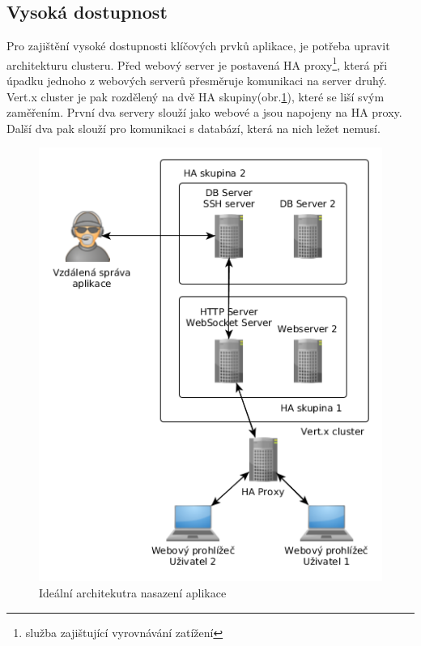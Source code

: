 \subsection{Vysoká dostupnost}

Pro zajištění vysoké dostupnosti klíčových prvků aplikace, je potřeba upravit architekturu clusteru. Před webový server je postavená HA proxy\footnote{služba zajištující vyrovnávání zatížení}, která při úpadku jednoho z webových serverů přesměruje komunikaci na server druhý. Vert.x cluster je pak rozdělený na dvě HA skupiny(obr.\ref{fig:architecture_ideal}), které se liší svým zaměřením. První dva servery slouží jako webové a jsou napojeny na HA proxy. Další dva pak slouží pro komunikaci s databází, která na nich ležet nemusí.

\begin{figure}
\begin{centering}
\includegraphics[scale=0.5]{obrazky/architecture_ideal}
\par\end{centering}
\caption{Ideální architekutra nasazení aplikace\label{fig:architecture_ideal}}
\end{figure}
